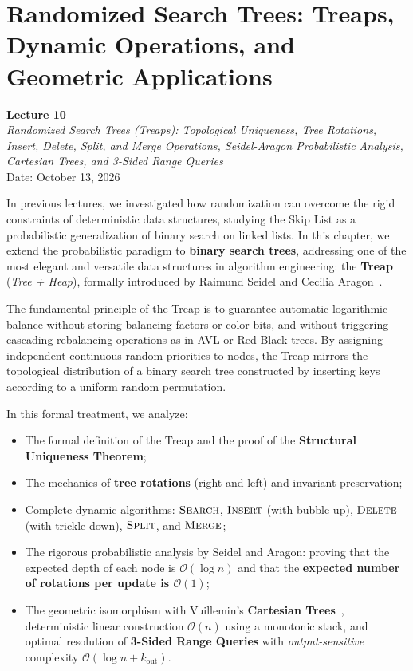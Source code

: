 \chapter{Randomized Search Trees: Treaps, Dynamic Operations, and Geometric Applications}
\label{chap:randomized-search-trees-treaps-en}

\begin{center}
  \textbf{Lecture 10}\\
  \emph{Randomized Search Trees (Treaps): Topological Uniqueness, Tree Rotations, Insert, Delete, Split, and Merge Operations, Seidel-Aragon Probabilistic Analysis, Cartesian Trees, and 3-Sided Range Queries}\\[0.5em]
  Date: October 13, 2026
\end{center}

In previous lectures, we investigated how randomization can overcome the rigid constraints of deterministic data structures, studying the Skip List as a probabilistic generalization of binary search on linked lists. In this chapter, we extend the probabilistic paradigm to \textbf{binary search trees}, addressing one of the most elegant and versatile data structures in algorithm engineering: the \textbf{Treap} (\textit{Tree + Heap}), formally introduced by Raimund Seidel and Cecilia Aragon~\cite{seidel1996}.

The fundamental principle of the Treap is to guarantee automatic logarithmic balance without storing balancing factors or color bits, and without triggering cascading rebalancing operations as in AVL or Red-Black trees. By assigning independent continuous random priorities to nodes, the Treap mirrors the topological distribution of a binary search tree constructed by inserting keys according to a uniform random permutation.

In this formal treatment, we analyze:
\begin{itemize}
    \item The formal definition of the Treap and the proof of the \textbf{Structural Uniqueness Theorem};
    \item The mechanics of \textbf{tree rotations} (right and left) and invariant preservation;
    \item Complete dynamic algorithms: $\textsc{Search}$, $\textsc{Insert}$ (with bubble-up), $\textsc{Delete}$ (with trickle-down), $\textsc{Split}$, and $\textsc{Merge}$;
    \item The rigorous probabilistic analysis by Seidel and Aragon: proving that the expected depth of each node is $\mathcal{O}(\log n)$ and that the \textbf{expected number of rotations per update is $\mathcal{O}(1)$};
    \item The geometric isomorphism with Vuillemin's \textbf{Cartesian Trees}~\cite{vuillemin1980}, deterministic linear construction $\mathcal{O}(n)$ using a monotonic stack, and optimal resolution of \textbf{3-Sided Range Queries} with \textit{output-sensitive} complexity $\mathcal{O}(\log n + k_{\text{out}})$.
\end{itemize}

